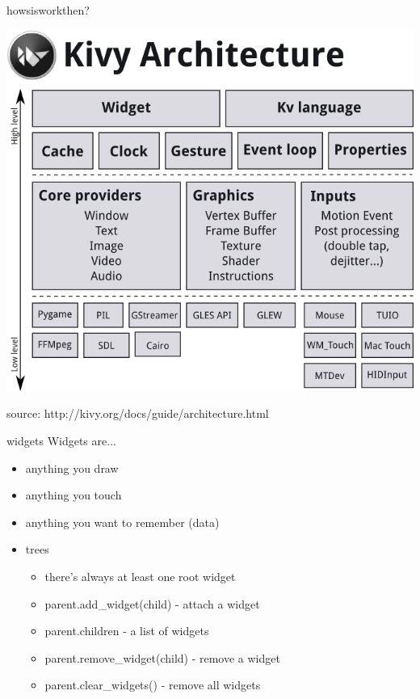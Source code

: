 \documentclass{beamer}
\begin{document}
\begin{frame}{howsisworkthen?}

\begin{center}
  \includegraphics[height=.75\textheight]{architecture.png}
\end{center}

source: http://kivy.org/docs/guide/architecture.html

\end{frame}


\begin{frame}{widgets}
Widgets are...
\pause
\begin{itemize}
  \item anything you draw
  \pause
  \item anything you touch
  \pause
  \item anything you want to remember (data)
  \pause
  \item trees
    \begin{itemize}
    \pause
    \item there's always at least one root widget
    \pause
    \item parent.add\_widget(child) - attach a widget
    \pause
    \item parent.children - a list of widgets
    \pause
    \item parent.remove\_widget(child) - remove a widget
    \pause
    \item parent.clear\_widgets() - remove all widgets
    \end{itemize}
\end{itemize}
\end{frame}
\end{document}
